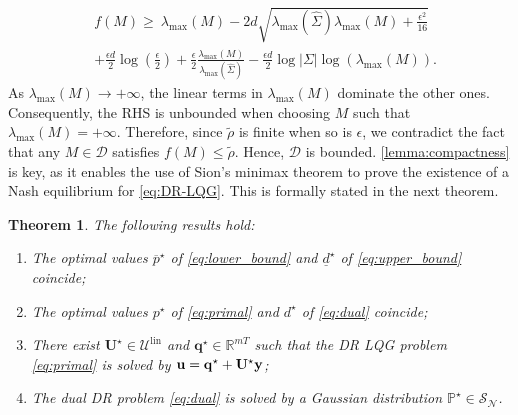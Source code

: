 \documentclass[letterpaper, 10 pt, conference]{ieeeconf}  %
\makeatletter
\renewenvironment{proof}[1][\proofname]{\par
  \pushQED{\qed}%
  \normalfont \topsep\z@
  \trivlist
  \item[\hskip2em
        \itshape
    #1\@addpunct{:}]\ignorespaces
}{%
  \popQED\endtrivlist\@endpefalse
}
\theoremstyle{ieeeconf}
\newtheorem{theorem}{Theorem}
\newcommand{\R}{\mathbb{R}}
\newcommand{\Prob}{\mathbb{P}}
\makeatother
\begin{document}
\begin{proof}
    \begin{equation*}
    \begin{aligned}
        &f(M) \geq\ \lambda_{\max}(M) 
        - 2d \sqrt{ \lambda_{\max}(\hat{\Sigma}) \lambda_{\max}(M) + \frac{\epsilon^2}{16} } 
        \\
        &+ \frac{\epsilon d}{2} \log\left( \frac{\epsilon}{2} \right)  + \frac{\epsilon}{2} \frac{\lambda_{\max}(M)}{ \lambda_{\max}(\hat{\Sigma}) } 
        - \frac{\epsilon d}{2}\log|\Sigma| \log\left( \lambda_{\max}(M) \right).
    \end{aligned}
    \end{equation*}
    As $\lambda_{\max}(M)\rightarrow +\infty$, the linear terms in $\lambda_{\max}(M)$ dominate the other ones. Consequently, the RHS is unbounded
    when choosing $M$ such that $\lambda_{\max}(M)= +\infty$. Therefore, since  $\tilde{\rho}$ is finite when so is $\epsilon$, 
    we contradict the fact that any $M\in\mathcal{D}$ satisfies $f(M) \leq \tilde{\rho}$. Hence, $\mathcal{D}$ is bounded.
\end{proof}
\cref{lemma:compactness} is key, as it enables the use of Sion's minimax theorem \cite[Theorem 3.4]{Sion1958} to prove the existence of a Nash equilibrium for \eqref{eq:DR-LQG}. This is formally stated in the next theorem. 
\begin{theorem}
\label{thm:Nash}
The following results hold:
\begin{enumerate}[leftmargin=*]
    \item The optimal values $\overline{p}^\star$ of \eqref{eq:lower_bound} and $\underline{d}^\star$ of \eqref{eq:upper_bound} coincide;
    \item The optimal values $p^\star$ of \eqref{eq:primal} and $d^\star$ of \eqref{eq:dual} coincide;
    \item There exist $\mathbf{U}^\star\in\mathcal{U}^\text{lin}$ and $\mathbf{q}^\star\in\R^{mT}$ such that the DR LQG problem \eqref{eq:primal} is solved by $\bf u = q^\star + U ^\star y$;
    \item The dual DR problem \eqref{eq:dual} is solved by a Gaussian distribution $\Prob^\star\in\mathcal{S_N}$. 
\end{enumerate}
\end{theorem}
\end{document}
